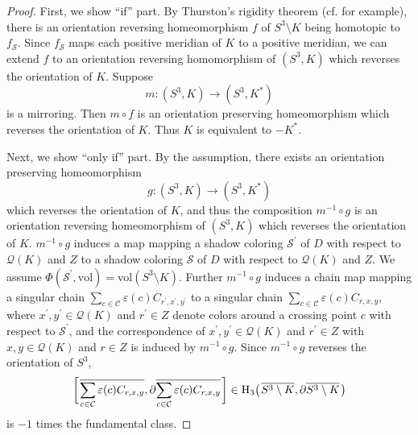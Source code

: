 \documentclass[12pt]{amsart}
\theoremstyle{definition}
\begin{document}
\begin{proof}
First, we show ``if'' part.
By Thurston's rigidity theorem (cf. \cite{Gromov1} for example), there is an orientation reversing homeomorphism $f$ of $S^{3} \setminus K$ being homotopic to $f_{\mathcal{S}}$.
Since $f_{\mathcal{S}}$ maps each positive meridian of $K$ to a positive meridian, we can extend $f$ to an orientation reversing homomorphism of $(S^{3}, K)$ which reverses the orientation of $K$.
Suppose
\[
 m : (S^{3}, K) \longrightarrow (S^{3}, K^{\ast})
\]
is a mirroring.
Then $m \circ f$ is an orientation preserving homeomorphism which reverses the orientation of $K$.
Thus $K$ is equivalent to $-K^{\ast}$.

Next, we show ``only if'' part.
By the assumption, there exists an orientation preserving homeomorphism
\[
 g : (S^{3}, K) \longrightarrow (S^{3}, K^{\ast})
\]
which reverses the orientation of $K$, and thus the composition $m^{-1} \circ g$ is an orientation reversing homeomorphism of $(S^{3}, K)$ which reverses the orientation of $K$.
$m^{-1} \circ g$ induces a map mapping a shadow coloring $\mathcal{S}^{\prime}$ of $D$ with respect to $\mathcal{Q}(K)$ and $Z$ to a shadow coloring $\mathcal{S}$ of $D$ with respect to $\mathcal{Q}(K)$ and $Z$.
We assume $\Phi(\mathcal{S}^{\prime}, \mathrm{vol}) = \mathrm{vol}(S^{3} \setminus K)$.
Further $m^{-1} \circ g$ induces a chain map mapping a singular chain $\displaystyle \sum_{c \in \mathcal{C}} \varepsilon(c) C_{r^{\prime}, x^{\prime}, y^{\prime}}$ to a singular chain $\displaystyle \sum_{c \in \mathcal{C}} \varepsilon(c) C_{r, x, y}$, where $x^{\prime}, y^{\prime} \in \mathcal{Q}(K)$ and $r^{\prime} \in Z$ denote colors around a crossing point $c$ with respect to $\mathcal{S}^{\prime}$, and the correspondence of $x^{\prime}, y^{\prime} \in \mathcal{Q}(K)$ and $r^{\prime} \in Z$ with $x, y \in \mathcal{Q}(K)$ and $r \in Z$ is induced by $m^{-1} \circ g$.
Since $m^{-1} \circ g$ reverses the orientation of $S^{3}$,
\[
 \biggl[ \hskip 0.1em \overline{\sum_{c \in \mathcal{C}} \varepsilon(c) C_{r, x, y}}, \partial \overline{\sum_{c \in \mathcal{C}} \varepsilon(c) C_{r, x, y}} \hskip 0.1em \biggr] \in \mathrm{H}_{3} \bigl( \hskip 0.1em \overline{S^{3} \setminus K}, \partial \overline{S^{3} \setminus K} \hskip 0.1em \bigr)
\]
is $-1$ times the fundamental class.
\end{proof}
\end{document}
